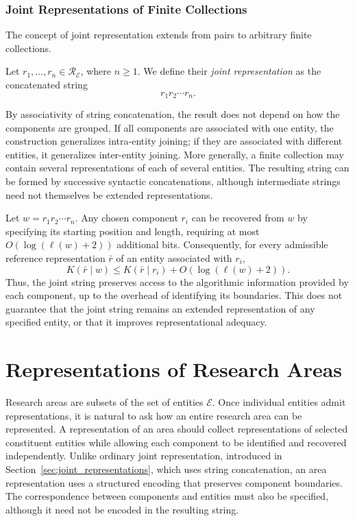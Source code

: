 \subsubsection*{Joint Representations of Finite Collections}

The concept of joint representation extends from pairs to arbitrary finite collections.

\begin{definition}
Let $r_1,\ldots,r_n\in\mathcal{R}_{\mathcal{E}}$, where $n\geq 1$. We define their \emph{joint representation} as the concatenated string
\[
r_1r_2\cdots r_n.
\]
\end{definition}

By associativity of string concatenation, the result does not depend on how the components are grouped. If all components are associated with one entity, the construction generalizes intra-entity joining; if they are associated with different entities, it generalizes inter-entity joining. More generally, a finite collection may contain several representations of each of several entities. The resulting string can be formed by successive syntactic concatenations, although intermediate strings need not themselves be extended representations.

Let $w=r_1r_2\cdots r_n$. Any chosen component $r_i$ can be recovered from $w$ by specifying its starting position and length, requiring at most $O(\log(\ell(w)+2))$ additional bits. Consequently, for every admissible reference representation $\bar r$ of an entity associated with $r_i$,
\[
K(\bar r\mid w)
\leq K(\bar r\mid r_i)+O(\log(\ell(w)+2)).
\]
Thus, the joint string preserves access to the algorithmic information provided by each component, up to the overhead of identifying its boundaries. This does not guarantee that the joint string remains an extended representation of any specified entity, or that it improves representational adequacy.

%
%


\section{Representations of Research Areas}
\label{sec:representations_research_areas}

Research areas are subsets of the set of entities $\mathcal E$. Once individual entities admit representations, it is natural to ask how an entire research area can be represented. A representation of an area should collect representations of selected constituent entities while allowing each component to be identified and recovered independently. Unlike ordinary joint representation, introduced in Section~\ref{sec:joint_representations}, which uses string concatenation, an area representation uses a structured encoding that preserves component boundaries. The correspondence between components and entities must also be specified, although it need not be encoded in the resulting string.

